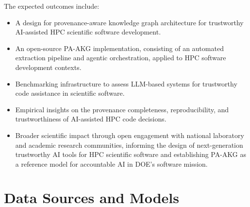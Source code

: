 \documentclass{files/proposalnsf}
\begin{document}
The expected outcomes include:
\begin{itemize}
    \item A design for provenance-aware knowledge graph architecture for trustworthy AI-assisted HPC scientific software development.
    \item An open-source PA-AKG implementation, consisting of an automated extraction pipeline and agentic orchestration, applied to HPC software development contexts.
    \item Benchmarking infrastructure to assess LLM-based systems for trustworthy code assistance in scientific software.
    \item Empirical insights on the provenance completeness, reproducibility, and trustworthiness of AI-assisted HPC code decisions.
    \item Broader scientific impact through open engagement with national laboratory and academic research communities, informing the design of next-generation trustworthy AI tools for HPC scientific software and establishing PA-AKG as a reference model for accountable AI in DOE's software mission.
\end{itemize}


\section{Data Sources and Models}


\end{document}
